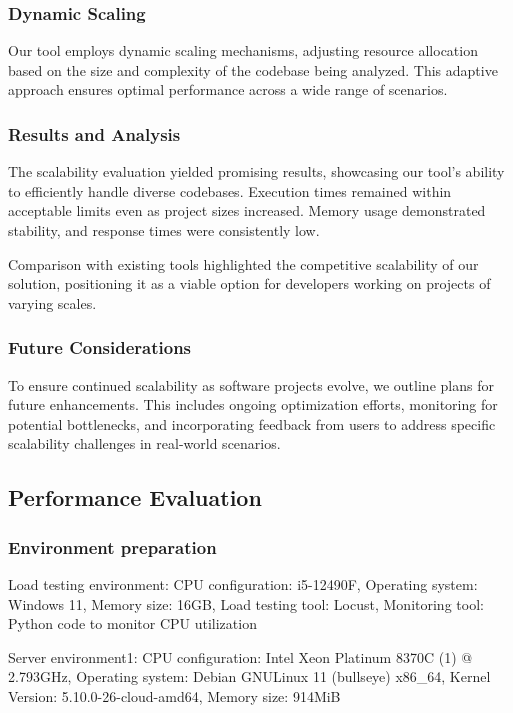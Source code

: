 \documentclass[journal]{IEEEtran}
\begin{document}
\subsubsection{Dynamic Scaling}

Our tool employs dynamic scaling mechanisms, adjusting resource allocation based on the size and complexity of the codebase being analyzed. This adaptive approach ensures optimal performance across a wide range of scenarios.

\subsubsection{Results and Analysis}

The scalability evaluation yielded promising results, showcasing our tool's ability to efficiently handle diverse codebases. Execution times remained within acceptable limits even as project sizes increased. Memory usage demonstrated stability, and response times were consistently low.

Comparison with existing tools highlighted the competitive scalability of our solution, positioning it as a viable option for developers working on projects of varying scales.

\subsubsection{Future Considerations}

To ensure continued scalability as software projects evolve, we outline plans for future enhancements. This includes ongoing optimization efforts, monitoring for potential bottlenecks, and incorporating feedback from users to address specific scalability challenges in real-world scenarios.

\subsection{Performance Evaluation}
\label{evaluate:performance}

\subsubsection{Environment preparation}
Load testing environment:
CPU configuration: i5-12490F,
Operating system: Windows 11,
Memory size: 16GB,
Load testing tool: Locust,
Monitoring tool: Python code to monitor CPU utilization

Server environment1:
CPU configuration: Intel Xeon Platinum 8370C (1) @ 2.793GHz,
Operating system: Debian GNU\/Linux 11 (bullseye) x86\_64,
Kernel Version: 5.10.0-26-cloud-amd64,
Memory size: 914MiB
\end{document}
